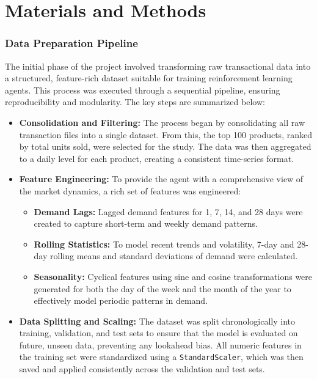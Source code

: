 \chapter{Materials and Methods}


\subsection*{Data Preparation Pipeline}

The initial phase of the project involved transforming raw transactional data into a structured, feature-rich dataset suitable for training reinforcement learning agents. This process was executed through a sequential pipeline, ensuring reproducibility and modularity. The key steps are summarized below:

\begin{itemize}
    \item \textbf{Consolidation and Filtering:} The process began by consolidating all raw transaction files into a single dataset. From this, the top 100 products, ranked by total units sold, were selected for the study. The data was then aggregated to a daily level for each product, creating a consistent time-series format.

    \item \textbf{Feature Engineering:} To provide the agent with a comprehensive view of the market dynamics, a rich set of features was engineered:
    \begin{itemize}
        \item \textbf{Demand Lags:} Lagged demand features for 1, 7, 14, and 28 days were created to capture short-term and weekly demand patterns.
        \item \textbf{Rolling Statistics:} To model recent trends and volatility, 7-day and 28-day rolling means and standard deviations of demand were calculated.
        \item \textbf{Seasonality:} Cyclical features using sine and cosine transformations were generated for both the day of the week and the month of the year to effectively model periodic patterns in demand.
    \end{itemize}

    \item \textbf{Data Splitting and Scaling:} The dataset was split chronologically into training, validation, and test sets to ensure that the model is evaluated on future, unseen data, preventing any lookahead bias. All numeric features in the training set were standardized using a \texttt{StandardScaler}, which was then saved and applied consistently across the validation and test sets.
\end{itemize}

